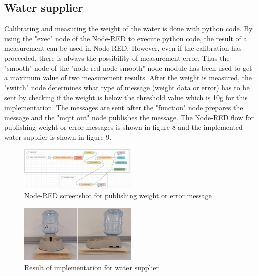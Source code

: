 ﻿\documentclass[conference]{IEEEtran}
\begin{document}
\subsection{Water supplier}
Calibrating and measuring the weight of the water is done with python code.
By using the "exec" node of the Node-RED to execute python code, the result of a measurement can be used in Node-RED.
However, even if the calibration has proceeded, there is always the possibility of measurement error.
Thus the "smooth" node of the "node-red-node-smooth" node module has been used to get a maximum value of two measurement results.
After the weight is measured, the "switch" node determines what type of message (weight data or error) has to be sent by checking if the weight is below the threshold value which is 10g for this implementation.
The messages are sent after the "function" node prepares the message and the "mqtt out" node publishes the message.
The Node-RED flow for publishing weight or error messages is shown in figure 8 and the implemented water supplier is shown in figure 9.

\begin{figure}[htbp]
\centerline{\includegraphics[width=0.5\textwidth]{./images/Water Supplier Error Detection.png}}
\caption{Node-RED screenshot for publishing weight or error message}
\label{fig}
\end{figure}

\begin{figure}[htbp]
\centerline{\includegraphics[width=0.5\textwidth]{./images/water-supplier.jpg}}
\caption{Result of implementation for water supplier}
\label{fig}
\end{figure}
\end{document}
